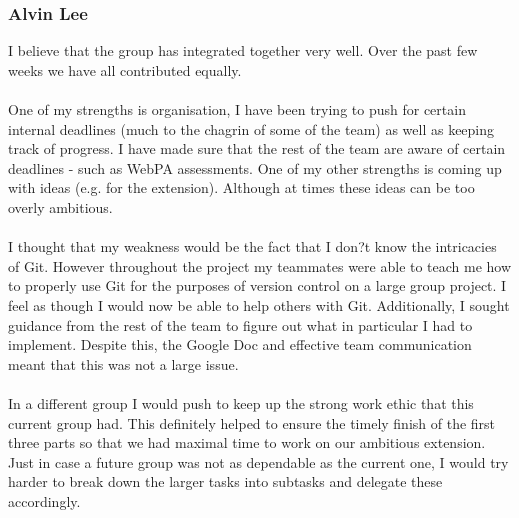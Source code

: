 \documentclass[11pt,twoside]{article}
\begin{document}
\subsubsection{Alvin Lee}
I believe that the group has integrated together very well. Over the past few weeks we have all contributed equally. 
\\\\
One of my strengths is organisation, I have been trying to push for certain internal deadlines (much to the chagrin of some of the team) as well as keeping track of progress. I have made sure that the rest of the team are aware of certain deadlines - such as WebPA assessments. One of my other strengths is coming up with ideas (e.g. for the extension). Although at times these ideas can be too overly ambitious.
\\\\
I thought that my weakness would be the fact that I don?t know the intricacies of Git. However throughout the project my teammates were able to teach me how to properly use Git for the purposes of version control on a large group project. I feel as though I would now be able to help others with Git. Additionally, I sought guidance from the rest of the team to figure out what in particular I had to implement. Despite this, the Google Doc and effective team communication meant that this was not a large issue. 
\\\\
In a different group I would push to keep up the strong work ethic that this current group had. This definitely helped to ensure the timely finish of the first three parts so that we had maximal time to work on our ambitious extension. Just in case a future group was not as dependable as the current one, I would try harder to break down the larger tasks into subtasks and delegate these accordingly.
\end{document}
